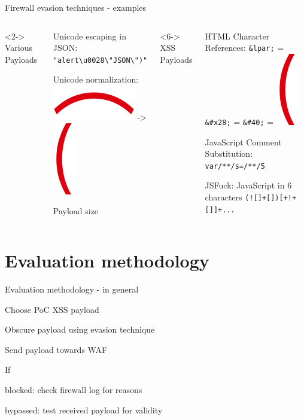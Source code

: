 \documentclass[aspectratio=169]{beamer}
\begin{document}
\begin{frame}[fragile]{Firewall evasion techniques - examples}
	\begin{columns}
		<2->
		Various Payloads
		\begin{vfilleditems}
			\item<3-> Unicode escaping in JSON: \verb|"alert\u0028\"JSON\")"|
			\item<4-> Unicode normalization: \  \includegraphics[width=.07\linewidth]{UFE35.png} -> \includegraphics[width=.02\linewidth]{U0028.png}
			\item<5-> Payload size
		\end{vfilleditems}
		<6->
		XSS Payloads
		\begin{vfilleditems}
			\item<7-> HTML Character References: \verb|&lpar;| {\color{red}=} \verb|&#x28;| {\color{red}=} \verb|&#40;| {\color{red}=} \includegraphics[width=.02\linewidth]{U0028.png}
			\item<8-> JavaScript Comment Substitution: \verb|var/**/s=/**/5|
			\item<9-> JSFuck: JavaScript in 6 characters \verb|(![]+[])[+!+[]]+...| \  \cite{mk/jsfuck}
		\end{vfilleditems}
	\end{columns}
\end{frame}

\section{Evaluation methodology}
\begin{frame}[fragile]{Evaluation methodology - in general}
	\begin{vfilleditems}
		\item<2-> Choose PoC XSS payload
		\item<3-> Obscure payload using evasion technique
		\item<4-> Send payload towards WAF
		\item<5-> If
		\begin{vfilleditems}
			\item<6-> blocked: check firewall log for reasons
			\item<7-> bypassed: test received payload for validity
		\end{vfilleditems}
	\end{vfilleditems}
\end{frame}
\end{document}

